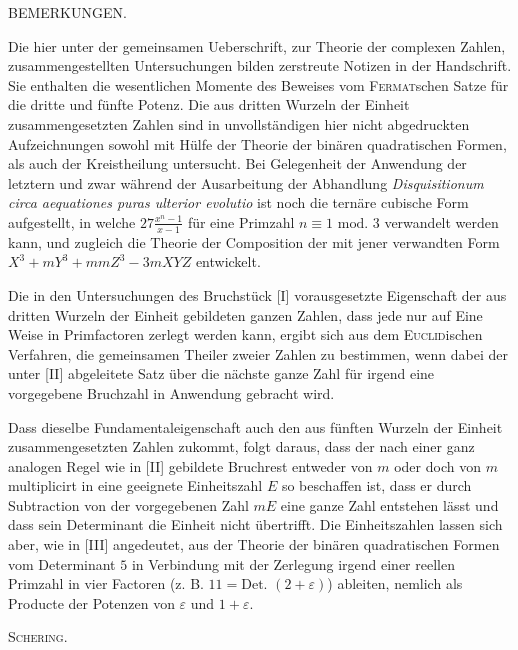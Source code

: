 %
\begin{center}BEMERKUNGEN.\end{center}
Die hier unter der gemeinsamen Ueberschrift, zur Theorie der complexen Zahlen, zusammengestellten Untersuchungen bilden zerstreute Notizen in der Handschrift. Sie enthalten die wesentlichen Momente des Beweises vom \textsc{Fermat}schen Satze für die dritte und fünfte Potenz. Die aus dritten Wurzeln der Einheit zusammengesetzten Zahlen sind in unvollständigen hier nicht abgedruckten Aufzeichnungen sowohl mit Hülfe der Theorie der binären quadratischen Formen, als auch der Kreistheilung untersucht. Bei Gelegenheit der Anwendung der letztern und zwar während der Ausarbeitung der Abhandlung \emph{Disquisitionum circa aequationes puras ulterior evolutio} ist noch die ternäre cubische Form aufgestellt, in welche $27\frac{x^n-1}{x-1}$ für eine Primzahl $n\equiv1\text{ mod. }3$ verwandelt werden kann, und zugleich die Theorie der Composition der mit jener verwandten Form $X^3+mY^3+mmZ^3-3mXYZ$ entwickelt.

Die in den Untersuchungen des Bruchstück [I] vorausgesetzte Eigenschaft der aus dritten Wurzeln der Einheit gebildeten ganzen Zahlen, dass jede nur auf Eine Weise in Primfactoren zerlegt werden kann, ergibt sich aus dem \textsc{Euclid}ischen Verfahren, die gemeinsamen Theiler zweier Zahlen zu bestimmen, wenn dabei der unter [II] abgeleitete Satz über die nächste ganze Zahl für irgend eine vorgegebene Bruchzahl in Anwendung gebracht wird.

Dass dieselbe Fundamentaleigenschaft auch den aus fünften Wurzeln der Einheit zusammengesetzten Zahlen zukommt, folgt daraus, dass der nach einer ganz analogen Regel wie in [II] gebildete Bruchrest entweder von $m$ oder doch von $m$ multiplicirt in eine geeignete Einheitszahl $E$ so beschaffen ist, dass er durch Subtraction von der vorgegebenen Zahl $mE$ eine ganze Zahl entstehen lässt und dass sein Determinant die Einheit nicht übertrifft. Die Einheitszahlen lassen sich aber, wie in [III] angedeutet, aus der Theorie der binären quadratischen Formen vom Determinant $5$ in Verbindung mit der Zerlegung irgend einer reellen Primzahl in vier Factoren (z. B. $11=\text{Det. }(2+\varepsilon)$) ableiten, nemlich als Producte der Potenzen von $\varepsilon$ und $1+\varepsilon$.
\begin{flushright}\textsc{Schering.}\end{flushright}

